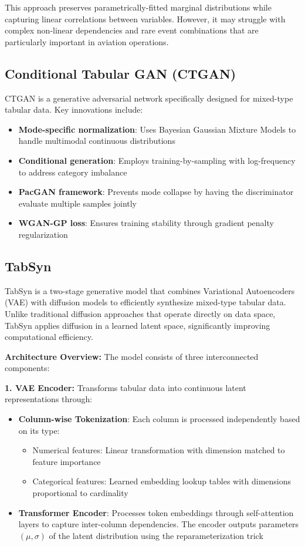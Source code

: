 \documentclass[conference]{IEEEtran}
\begin{document}
This approach preserves parametrically-fitted marginal distributions while capturing linear correlations between variables. However, it may struggle with complex non-linear dependencies and rare event combinations that are particularly important in aviation operations.


\subsection{Conditional Tabular GAN (CTGAN)}

CTGAN\cite{xu2019modeling} is a generative adversarial network specifically designed for mixed-type tabular data. Key innovations include:
\begin{itemize}
    \item \textbf{Mode-specific normalization}: Uses Bayesian Gaussian Mixture Models to handle multimodal continuous distributions
    \item \textbf{Conditional generation}: Employs training-by-sampling with log-frequency to address category imbalance
    \item \textbf{PacGAN framework}: Prevents mode collapse by having the discriminator evaluate multiple samples jointly
    \item \textbf{WGAN-GP loss}: Ensures training stability through gradient penalty regularization
\end{itemize}

\subsection{TabSyn}

TabSyn \cite{zhang2024mixed} is a two-stage generative model that combines Variational Autoencoders (VAE) with diffusion models to efficiently synthesize mixed-type tabular data. Unlike traditional diffusion approaches that operate directly on data space, TabSyn applies diffusion in a learned latent space, significantly improving computational efficiency.

\textbf{Architecture Overview:} The model consists of three interconnected components:

\textbf{1. VAE Encoder:} Transforms tabular data into continuous latent representations through:
\begin{itemize}
    \item \textbf{Column-wise Tokenization}: Each column is processed independently based on its type:
    \begin{itemize}
        \item Numerical features: Linear transformation with dimension matched to feature importance
        \item Categorical features: Learned embedding lookup tables with dimensions proportional to cardinality
    \end{itemize}
    \item \textbf{Transformer Encoder}: Processes token embeddings through self-attention layers to capture inter-column dependencies. The encoder outputs parameters $(\mu, \sigma)$ of the latent distribution using the reparameterization trick
\end{itemize}
\end{document}
